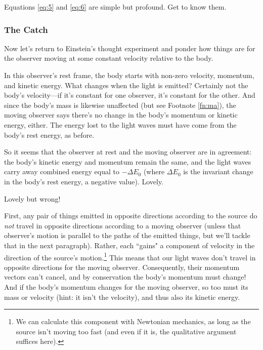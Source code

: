 \documentclass[12pt]{article}
\begin{document}
Equations \ref{eq:5} and \ref{eq:6} are simple but profound. Get to know them.

\subsubsection{The Catch}\label{sssec:tc}

Now let's return to Einstein's thought experiment and ponder how things are for the observer moving at some constant velocity relative to the body.

In this observer's rest frame, the body starts with non-zero velocity, momentum, and kinetic energy. What changes when the light is emitted? Certainly not the body's velocity---if it's constant for one observer, it's constant for the other. And since the body's mass is likewise unaffected (but see Footnote \ref{fn:ma}), the moving observer says there's no change in the body's momentum or kinetic energy, either. The energy lost to the light waves must have come from the body's rest energy, as before.

So it seems that the observer at rest and the moving observer are in agreement: the body's kinetic energy and momentum remain the same, and the light waves carry away combined energy equal to $-\Delta E_0$ (where $\Delta E_0$ is the invariant change in the body's rest energy, a negative value). Lovely.

Lovely but wrong!

First, any pair of things emitted in opposite directions according to the source do \emph{not} travel in opposite directions according to a moving observer (unless that observer's motion is parallel to the paths of the emitted things, but we'll tackle that in the next paragraph). Rather, each ``gains" a component of velocity in the direction of the source's motion.\footnote{We can calculate this component with Newtonian mechanics, as long as the source isn't moving too fast (and even if it is, the qualitative argument suffices here).} This means that our light waves don't travel in opposite directions for the moving observer. Consequently, their momentum vectors can't cancel, and by conservation the body's momentum must change! And if the body's momentum changes for the moving observer, so too must its mass or velocity (hint: it isn't the velocity), and thus also its kinetic energy.
\end{document}

